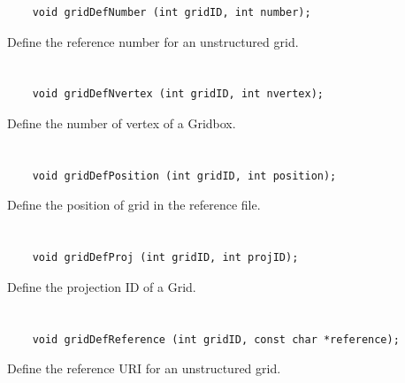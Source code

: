 \begin{verbatim}
    void gridDefNumber (int gridID, int number);
\end{verbatim}

Define the reference number for an unstructured grid.


\section*{\tt {}}

\begin{verbatim}
    void gridDefNvertex (int gridID, int nvertex);
\end{verbatim}

Define the number of vertex of a Gridbox.


\section*{\tt {}}

\begin{verbatim}
    void gridDefPosition (int gridID, int position);
\end{verbatim}

Define the position of grid in the reference file.


\section*{\tt {}}

\begin{verbatim}
    void gridDefProj (int gridID, int projID);
\end{verbatim}

Define the projection ID of a Grid.


\section*{\tt {}}

\begin{verbatim}
    void gridDefReference (int gridID, const char *reference);
\end{verbatim}

Define the reference URI for an unstructured grid.


\section*{\tt {}}

